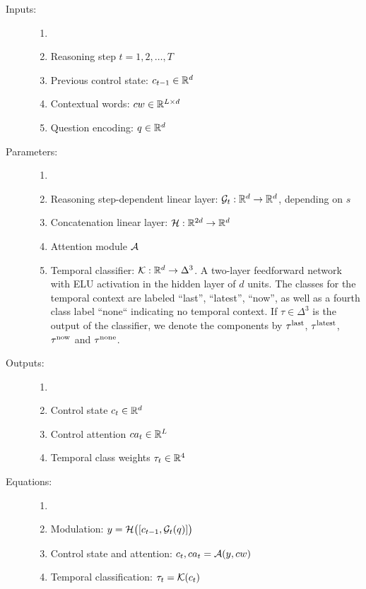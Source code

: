 \begin{description}
	\item[Inputs:] 
	\begin{enumerate}
		\item[]
		\item Reasoning step $t = 1,2, \dots, T$
		\item Previous control state: $c_{t-1} \in \mathbb{R}^d$	
		\item Contextual words: $cw \in \mathbb{R}^{L \times d}$
		\item Question encoding: $q \in \mathbb{R}^d$
	\end{enumerate}
	
	\item[Parameters:] 
	\begin{enumerate}
		\item[]
		\item Reasoning step-dependent linear layer: $\mathcal{G}_t: \mathbb{R}^d \to \mathbb{R}^d$, depending on $s$
		\item Concatenation linear layer: $\mathcal{H}: \mathbb{R}^{2d} \to \mathbb{R}^d$
		\item Attention module $\mathcal{A}$
		\item Temporal classifier:  $\mathcal{K}: \mathbb{R}^d \to \Delta^3$. A two-layer feedforward
		network with ELU activation in the hidden layer of $d$ units.	
		The classes for the temporal context are labeled ``last'', ``latest'', ``now'', as well as 
		a fourth class label ``none`` indicating no temporal context.
		If $\tau \in \Delta^3$ is the output of the classifier, we denote the components by
		$\tau^{\mathrm{last}}$, $\tau^{\mathrm{latest}}$, $\tau^{\mathrm{now}}$ and $\tau^{\mathrm{none}}$.
	\end{enumerate}
	
	\item[Outputs:] 
	\begin{enumerate}
		\item[]
		\item Control state $c_t \in \mathbb{R}^d$
		\item Control attention $ca_t \in \mathbb{R}^L$
		\item Temporal class weights $\tau_t \in \mathbb{R}^4$
	\end{enumerate}
	
	\item[Equations:] 
	\begin{enumerate}
		\item[]
		\item Modulation: $y = \mathcal{H}\bigl([c_{t-1}, \mathcal{G}_t(q)]\bigr)$
		\item Control state and attention: $c_t,  ca_t= \mathcal{A}(y, cw)$
		\item Temporal classification: $\tau_t = \mathcal{K}(c_t)$
	\end{enumerate}
\end{description}



